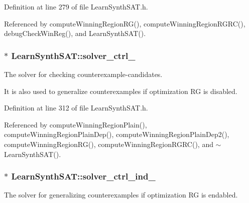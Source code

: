 Definition at line 279 of file Learn\-Synth\-S\-A\-T.\-h.



Referenced by compute\-Winning\-Region\-R\-G(), compute\-Winning\-Region\-R\-G\-R\-C(), debug\-Check\-Win\-Reg(), and Learn\-Synth\-S\-A\-T().

\hypertarget{classLearnSynthSAT_abb28d64291205442f1df055049ef0195}{
\subsubsection[{solver\-\_\-ctrl\-\_\-}]{$\ast$ Learn\-Synth\-S\-A\-T\-::solver\-\_\-ctrl\-\_\-\hspace{0.3cm}{\ttfamily [protected]}}}\label{classLearnSynthSAT_abb28d64291205442f1df055049ef0195}


The solver for checking counterexample-\/candidates. 

It is also used to generalize counterexamples if optimization R\-G is disabled. 

Definition at line 312 of file Learn\-Synth\-S\-A\-T.\-h.



Referenced by compute\-Winning\-Region\-Plain(), compute\-Winning\-Region\-Plain\-Dep(), compute\-Winning\-Region\-Plain\-Dep2(), compute\-Winning\-Region\-R\-G(), compute\-Winning\-Region\-R\-G\-R\-C(), and $\sim$\-Learn\-Synth\-S\-A\-T().

\hypertarget{classLearnSynthSAT_ab81d5f53e078238feb1e948a5a5366ff}{
\subsubsection[{solver\-\_\-ctrl\-\_\-ind\-\_\-}]{$\ast$ Learn\-Synth\-S\-A\-T\-::solver\-\_\-ctrl\-\_\-ind\-\_\-\hspace{0.3cm}{\ttfamily [protected]}}}\label{classLearnSynthSAT_ab81d5f53e078238feb1e948a5a5366ff}


The solver for generalizing counterexamples if optimization R\-G is endabled. 



